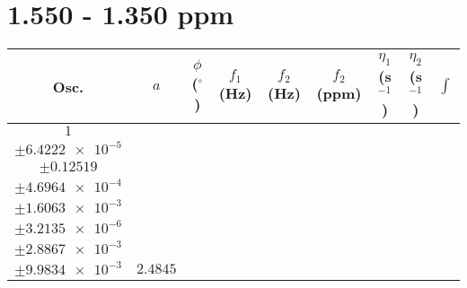 \documentclass[8pt]{article}
\begin{document}
\section*{1.550 - 1.350 ppm}
\begin{longtable}[l]{c c c c c c c c c}
\toprule
Osc. & $a$ & $\phi$ ($^{\circ}$) & $f_1$ (Hz) & $f_2$ (Hz) & $f_2$ (ppm) & $\eta_1$ (s$^{-1}$) & $\eta_2$ (s$^{-1}$) & $\int$\\
\midrule
$\num{1}$ & \begin{tabular}[c]{@{}c@{}}$\num{2.9978e-2}$ \\ $\pm\num{6.4222e-5}$\end{tabular} & \begin{tabular}[c]{@{}c@{}}$\num{-0.1796}$ \\ $\pm\num{0.12519}$\end{tabular} & \begin{tabular}[c]{@{}c@{}}$\num{-9.3677}$ \\ $\pm\num{4.6964e-4}$\end{tabular} & \begin{tabular}[c]{@{}c@{}}$\num{721.21}$ \\ $\pm\num{1.6063e-3}$\end{tabular} & \begin{tabular}[c]{@{}c@{}}$\num{1.4428}$ \\ $\pm\num{3.2135e-6}$\end{tabular} & \begin{tabular}[c]{@{}c@{}}$\num{1.15}$ \\ $\pm\num{2.8867e-3}$\end{tabular} & \begin{tabular}[c]{@{}c@{}}$\num{4.2183}$ \\ $\pm\num{9.9834e-3}$\end{tabular} & $\num{2.4845}$\\

\end{longtable}
\end{document}
